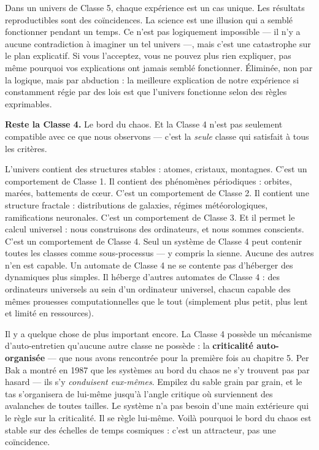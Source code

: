 \documentclass[11pt, twoside, openright]{book}
\begin{document}
Dans un univers de Classe 5, chaque expérience est un cas unique. Les résultats reproductibles sont des coïncidences. La science est une illusion qui a semblé fonctionner pendant un temps. Ce n'est pas logiquement impossible --- il n'y a aucune contradiction à imaginer un tel univers ---, mais c'est une catastrophe sur le plan explicatif. Si vous l'acceptez, vous ne pouvez plus rien expliquer, pas même pourquoi vos explications ont jamais semblé fonctionner. Éliminée, non par la logique, mais par abduction : la meilleure explication de notre expérience si constamment régie par des lois est que l'univers fonctionne selon des règles exprimables.

\textbf{Reste la Classe 4.} Le bord du chaos. Et la Classe 4 n'est pas seulement compatible avec ce que nous observons --- c'est la \textit{seule} classe qui satisfait à tous les critères.

L'univers contient des structures stables : atomes, cristaux, montagnes. C'est un comportement de Classe 1. Il contient des phénomènes périodiques : orbites, marées, battements de cœur. C'est un comportement de Classe 2. Il contient une structure fractale : distributions de galaxies, régimes météorologiques, ramifications neuronales. C'est un comportement de Classe 3. Et il permet le calcul universel : nous construisons des ordinateurs, et nous sommes conscients. C'est un comportement de Classe 4. Seul un système de Classe 4 peut contenir toutes les classes comme sous-processus --- y compris la sienne. Aucune des autres n'en est capable. Un automate de Classe 4 ne se contente pas d'héberger des dynamiques plus simples. Il héberge d'autres automates de Classe 4 : des ordinateurs universels au sein d'un ordinateur universel, chacun capable des mêmes prouesses computationnelles que le tout (simplement plus petit, plus lent et limité en ressources).

Il y a quelque chose de plus important encore. La Classe 4 possède un mécanisme d'auto-entretien qu'aucune autre classe ne possède : la \textbf{criticalité auto-organisée} --- que nous avons rencontrée pour la première fois au chapitre 5. Per Bak a montré en 1987 que les systèmes au bord du chaos ne s'y trouvent pas par hasard --- ils s'y \textit{conduisent eux-mêmes}. Empilez du sable grain par grain, et le tas s'organisera de lui-même jusqu'à l'angle critique où surviennent des avalanches de toutes tailles. Le système n'a pas besoin d'une main extérieure qui le règle sur la criticalité. Il se règle lui-même. Voilà pourquoi le bord du chaos est stable sur des échelles de temps cosmiques : c'est un attracteur, pas une coïncidence.
\end{document}
